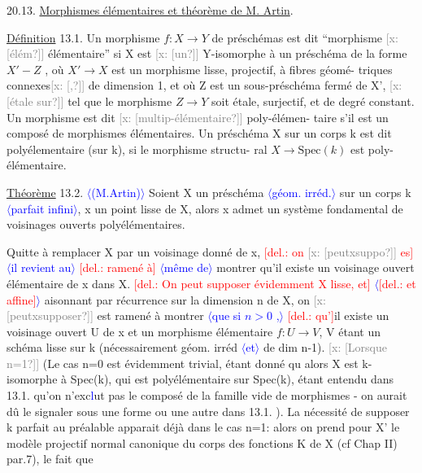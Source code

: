 \documentclass[11pt]{article}
\newcommand{\scanpage}[1]{\par\bigskip\noindent{\small\sffamily[scan #1]}\par}
\newcommand{\mspage}[1]{{\small\sffamily[p.\,#1]}}
\newcommand{\hand}[1]{\textcolor{blue}{#1}}
\let\over\relax
\newcommand{\over}[2]{\textcolor{gray}{#1}\textcolor{blue}{\ensuremath{^{\!\nearrow}}#2}}
\newcommand{\inserted}[2][]{\textcolor{blue}{$\langle$#2$\rangle$}}
\newcommand{\deleted}[1]{\textcolor{red}{[\textsf{del.:} #1]}}
\newcommand{\xout}[1]{\textcolor{gray}{[\textsf{x:} #1]}}
\newcommand{\uline}[1]{\underline{#1}}
\newcommand{\unsure}[1]{[#1?]}
\begin{document}
\mspage{\hand{74}}

\clearpage
\scanpage{25/75}
\mspage{70}

20.13. \uline{Morphismes élémentaires et théorème de M. Artin}.

\uline{Définition} 13.1. Un morphisme $f:X\to Y$ de préschémas est dit ``morphisme
\xout{\unsure{élém}} élémentaire'' si X est \xout{\unsure{un}} Y-isomorphe à un préschéma de la forme
$X' - Z$ , où $X'\to X$ est un morphisme lisse, projectif, à fibres géomé-%
triques connexes\xout{\unsure{,}} de dimension 1, et où Z est un sous-préschéma fermé
de X', \xout{\unsure{étale sur}} tel que le morphisme $Z\to Y$ soit étale, surjectif, et
de degré constant. Un morphisme est dit \xout{\unsure{multip-élémentaire}} poly-élémen-%
taire s'il est un composé de morphismes élémentaires. Un préschéma X
sur un corps k est dit polyélementaire (sur k), si le morphisme structu-%
ral $X\to \mathrm{Spec}(k)$ est poly-élémentaire.

\uline{Théorème} 13.2. \inserted[typed]{(M.Artin)} Soient X un préschéma \inserted[typed]{géom. irréd.} sur un corps k \inserted[typed]{parfait infini}, x un point lisse
de X, alors x admet un système fondamental de voisinages ouverts
polyélémentaires.

Quitte à remplacer X par un voisinage donné de x, \deleted{on \xout{\unsure{peutxsuppo}} es} \inserted{il revient au}
\deleted{ramené à} \inserted{même de} montrer qu'il existe un voisinage ouvert élémentaire de x dans X.
\deleted{On peut supposer évidemment X lisse, et} \inserted[typed]{\deleted{et affine}} \over{r}{R}aisonnant par récurrence sur
la dimension n de X, on \xout{\unsure{peutxsupposer}} est ramené à montrer \inserted[typed]{que si $n>0$ ,} \deleted{qu'}il existe
un voisinage ouvert U de x et un morphisme élémentaire $f: U\to V$,
V étant un schéma lisse sur k (nécessairement géom. irréd \inserted[typed]{et} de dim n-1).
\xout{\unsure{Lorsque n=1}} (Le cas n=0 est évidemment trivial, étant donné qu\over{e}{'} alors
X est k-isomorphe à Spec(k), qui est polyélémentaire sur Spec(k), étant
entendu dans 13.1. qu'on n'exc\hand{l}ut pas le composé de la famille vide de
morphismes - on aurait dû le signaler sous une forme ou une autre dans
13.1. ). La nécessité de supposer k parfait au préalable apparait déjà
dans le cas n=1: alors on prend pour X' le modèle projectif normal
canonique du corps des fonctions K de X (cf Chap II) par.7), le fait que
\end{document}
